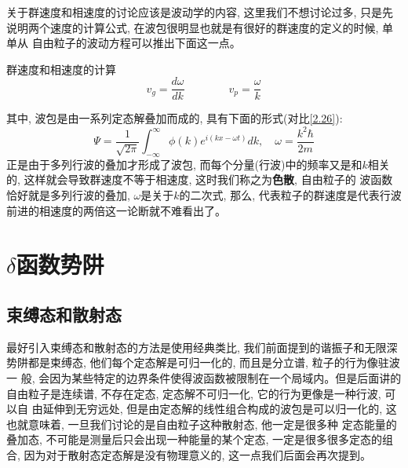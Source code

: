 \documentclass[a4paper,zihao=-4,linespread=1]{ctexrep}
\newenvironment{lequation}{\large\begin{equation}}{\end{equation}}
\begin{document}
    关于群速度和相速度的讨论应该是波动学的内容, 这里我们不想讨论过多, 只是先说明两个速度的计算公式, 在波包很明显也就是有很好的群速度的定义的时候, 单单从
    自由粒子的波动方程可以推出下面这一点。
    \begin{theorem}{群速度和相速度的计算}
        \begin{lequation}
            \boxed{
               v_g=\frac{d\omega}{dk}\qquad\qquad v_p=\frac{\omega}{k} 
            }
        \end{lequation}
    \end{theorem}
    其中, 波包是由一系列定态解叠加而成的, 具有下面的形式(对比\ref{2.26}):
    $$\Psi=\frac{1}{\sqrt{2\pi}}\int_{-\infty}^{\infty}\phi(k)e^{i\left(kx-\omega t\right)}dk,\quad \omega=\frac{k^2\hbar}{2m}$$
    正是由于多列行波的叠加才形成了波包, 而每个分量(行波)中的频率又是和$k$相关的, 这样就会导致群速度不等于相速度, 这时我们称之为\textbf{色散}, 自由粒子的
    波函数恰好就是多列行波的叠加, $\omega$是关于$k$的二次式, 那么, 代表粒子的群速度是代表行波前进的相速度的两倍这一论断就不难看出了。
    \section{\texorpdfstring{$\delta$}.函数势阱}
    \subsection{束缚态和散射态}
    最好引入束缚态和散射态的方法是使用经典类比, 我们前面提到的谐振子和无限深势阱都是束缚态, 他们每个定态解是可归一化的, 而且是分立谱, 粒子的行为像驻波一
    般, 会因为某些特定的边界条件使得波函数被限制在一个局域内。但是后面讲的自由粒子是连续谱, 不存在定态, 定态解不可归一化, 它的行为更像是一种行波, 可以自
    由延伸到无穷远处, 但是由定态解的线性组合构成的波包是可以归一化的, 这也就意味着, 一旦我们讨论的是自由粒子这种散射态, 他一定是很多种
    定态能量的叠加态, 不可能是测量后只会出现一种能量的某个定态, 一定是很多很多定态的组合, 因为对于散射态定态解是没有物理意义的, 这一点我们后面会再次提到。
\end{document}
